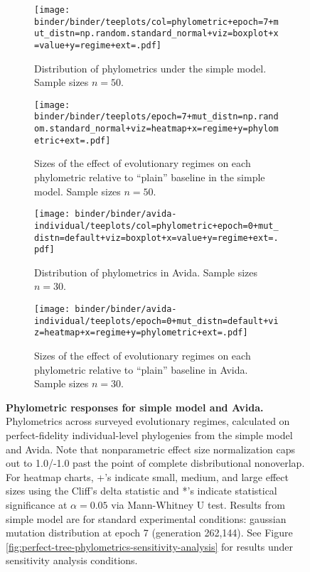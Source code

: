 \begin{figure*}
  \centering
  \begin{subfigure}[b]{\textwidth}
    \texttt{[image: binder/binder/teeplots/col=phylometric+epoch=7+mut\_distn=np.random.standard\_normal+viz=boxplot+x=value+y=regime+ext=.pdf]}
  \caption{%
    Distribution of phylometrics under the simple model.
    Sample sizes $n=50$.
  }
  \label{fig:perfect-tree-phylometrics-simple-boxplot}
  \end{subfigure}

  \begin{subfigure}[b]{\textwidth}
    \texttt{[image: binder/binder/teeplots/epoch=7+mut\_distn=np.random.standard\_normal+viz=heatmap+x=regime+y=phylometric+ext=.pdf]}
    \caption{
 Sizes of the effect of evolutionary regimes on each phylometric relative to ``plain'' baseline in the simple model.
    Sample sizes $n=50$.
    }
\label{fig:perfect-tree-phylometrics-simple-heatmap}
  \end{subfigure}%

\begin{subfigure}[b]{\textwidth}
  \texttt{[image: binder/binder/avida-individual/teeplots/col=phylometric+epoch=0+mut\_distn=default+viz=boxplot+x=value+y=regime+ext=.pdf]}
  \caption{
  Distribution of phylometrics in Avida.
  Sample sizes $n=30$.
  }
  \label{fig:perfect-tree-phylometrics-avida-boxplot}
\end{subfigure}%

\begin{subfigure}[b]{\textwidth}
  \texttt{[image: binder/binder/avida-individual/teeplots/epoch=0+mut\_distn=default+viz=heatmap+x=regime+y=phylometric+ext=.pdf]}
\caption{%
   Sizes of the effect of evolutionary regimes on each phylometric relative to ``plain'' baseline in Avida. Sample sizes $n=30$.
}
\label{fig:perfect-tree-phylometrics-avida-heatmap}
\end{subfigure}

  \caption{%
  \textbf{Phylometric responses for simple model and Avida.}
  Phylometrics across surveyed evolutionary regimes, calculated on perfect-fidelity individual-level phylogenies from the simple model and Avida.
  Note that nonparametric effect size normalization caps out to 1.0/-1.0 past the point of complete disbributional nonoverlap.
  For heatmap charts, +'s indicate small, medium, and large effect sizes using the Cliff's delta statistic and *'s indicate statistical significance at $\alpha = 0.05$ via Mann-Whitney U test.
  Results from simple model are for standard experimental conditions: gaussian mutation distribution at epoch 7 (generation 262,144).
  See Figure \ref{fig:perfect-tree-phylometrics-sensitivity-analysis} for results under sensitivity analysis conditions.
  }
  \label{fig:perfect-tree-phylometrics}
\end{figure*}
